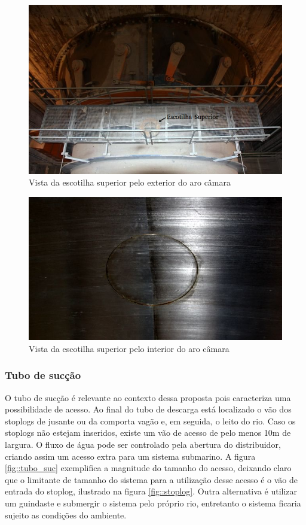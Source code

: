 \begin{figure}[h!]	
	\includegraphics[width=\columnwidth]{figs/viagem/2015_04_28/UG/img_4979_mod}
	\caption{Vista da escotilha superior pelo exterior do aro câmara}
	\label{fig::esc_sup_ext}
\end{figure}

\begin{figure}[h!]	
	\includegraphics[width=\columnwidth]{figs/viagem/2015_04_28/UG/img_4982}
	\caption{Vista da escotilha superior pelo interior do aro câmara}
	\label{fig::esc_sup_int}
\end{figure}

\subsubsection{Tubo de sucção}

O tubo de sucção é relevante ao contexto dessa proposta pois caracteriza uma 
possibilidade de acesso. Ao final do tubo de descarga está localizado o vão dos stoplogs 
de jusante ou da comporta vagão e, em seguida, o leito do rio. Caso os stoplogs 
não estejam inseridos, existe um vão de acesso de pelo menos 10m de largura. O 
fluxo de água pode ser controlado pela abertura do distribuidor, criando assim 
um acesso extra para um sistema submarino. A figura \ref{fig::tubo_suc}
exemplifica a magnitude do tamanho do acesso, deixando claro que o limitante de
tamanho do sistema para a utilização desse acesso é o vão de entrada do stoplog,
ilustrado na figura \ref{fig::stoplog}. Outra alternativa é utilizar um
guindaste e submergir o sistema pelo próprio rio, entretanto o sistema ficaria
sujeito as condições do ambiente.

